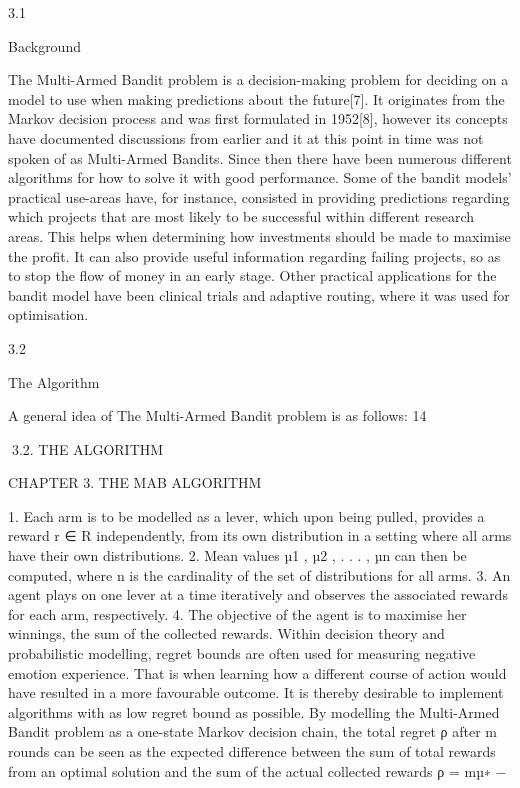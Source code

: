 3.1

Background

The Multi-Armed Bandit problem is a decision-making problem for deciding on a model
to use when making predictions about the future[7]. It originates from the Markov decision process and was first formulated in 1952[8], however its concepts have documented
discussions from earlier and it at this point in time was not spoken of as Multi-Armed
Bandits. Since then there have been numerous different algorithms for how to solve it
with good performance.
Some of the bandit models’ practical use-areas have, for instance, consisted in providing
predictions regarding which projects that are most likely to be successful within different
research areas. This helps when determining how investments should be made to maximise the profit. It can also provide useful information regarding failing projects, so as
to stop the flow of money in an early stage. Other practical applications for the bandit
model have been clinical trials and adaptive routing, where it was used for optimisation.

3.2

The Algorithm

A general idea of The Multi-Armed Bandit problem is as follows:
14

3.2. THE ALGORITHM

CHAPTER 3. THE MAB ALGORITHM

1. Each arm is to be modelled as a lever, which upon being pulled, provides a reward
r ∈ R independently, from its own distribution in a setting where all arms have
their own distributions.
2. Mean values µ1 , µ2 , . . . , µn can then be computed, where n is the cardinality of the
set of distributions for all arms.
3. An agent plays on one lever at a time iteratively and observes the associated
rewards for each arm, respectively.
4. The objective of the agent is to maximise her winnings, the sum of the collected
rewards.
Within decision theory and probabilistic modelling, regret bounds are often used for
measuring negative emotion experience. That is when learning how a different course
of action would have resulted in a more favourable outcome. It is thereby desirable to
implement algorithms with as low regret bound as possible.
By modelling the Multi-Armed Bandit problem as a one-state Markov decision chain,
the total regret ρ after m rounds can be seen as the expected difference between the sum
of total rewards from an optimal solution and the sum of the actual collected rewards
ρ = mµ∗ −

